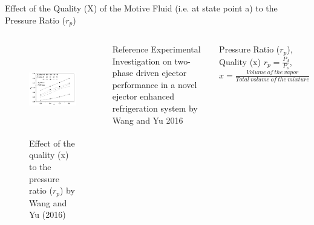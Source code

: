 \begin{frame}{Effect of the Quality (X) of the Motive Fluid (i.e. at state point a) to the Pressure Ratio ($r_{p}$)\cite{wang2016experimental}}
\begin{columns}
    \begin{figure}[h]
      \centering
      \includegraphics[height=4cm]{images/partialevaprp.png}
      \caption{\scriptsize \centering Effect of the quality (x) to the pressure ratio ($r_{p}$) by Wang and Yu (2016) \cite{wang2016experimental}}
   \end{figure}
    \begin{block}{Reference}
     Experimental Investigation on two-phase driven ejector performance in a novel ejector enhanced refrigeration system by Wang and Yu 2016 \cite{wang2016experimental}
    \end{block}
    \begin{block}{Pressure Ratio ($r_{p}$), Quality (x)}
     $r_{p} = \frac{P_{d}}{P_{s}}$, \: $x = \frac{Volume\:of\:the\:vapor}{Total\:volume\:of \:the\:mixture}$
    \end{block}
\end{columns}
\end{frame}

